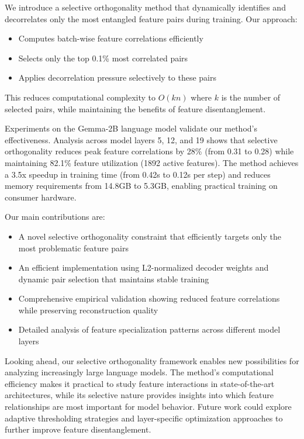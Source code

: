 \documentclass{article} %
\begin{document}
We introduce a selective orthogonality method that dynamically identifies and decorrelates only the most entangled feature pairs during training. Our approach:
\begin{itemize}
    \item Computes batch-wise feature correlations efficiently
    \item Selects only the top 0.1\% most correlated pairs
    \item Applies decorrelation pressure selectively to these pairs
\end{itemize}
This reduces computational complexity to $O(kn)$ where $k$ is the number of selected pairs, while maintaining the benefits of feature disentanglement.

Experiments on the Gemma-2B language model validate our method's effectiveness. Analysis across model layers 5, 12, and 19 shows that selective orthogonality reduces peak feature correlations by 28\% (from 0.31 to 0.28) while maintaining 82.1\% feature utilization (1892 active features). The method achieves a 3.5x speedup in training time (from 0.42s to 0.12s per step) and reduces memory requirements from 14.8GB to 5.3GB, enabling practical training on consumer hardware.

Our main contributions are:
\begin{itemize}
    \item A novel selective orthogonality constraint that efficiently targets only the most problematic feature pairs
    \item An efficient implementation using L2-normalized decoder weights and dynamic pair selection that maintains stable training
    \item Comprehensive empirical validation showing reduced feature correlations while preserving reconstruction quality
    \item Detailed analysis of feature specialization patterns across different model layers
\end{itemize}

Looking ahead, our selective orthogonality framework enables new possibilities for analyzing increasingly large language models. The method's computational efficiency makes it practical to study feature interactions in state-of-the-art architectures, while its selective nature provides insights into which feature relationships are most important for model behavior. Future work could explore adaptive thresholding strategies and layer-specific optimization approaches to further improve feature disentanglement.
\end{document}
